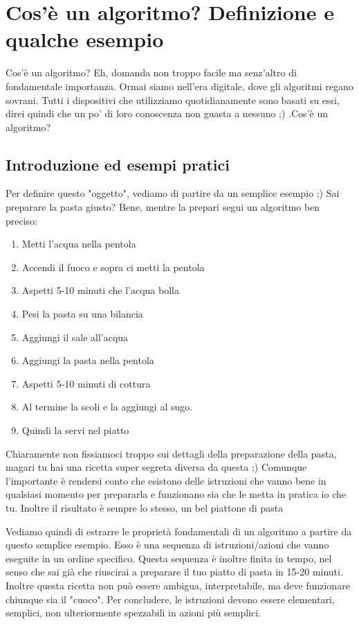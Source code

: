 
\chapter{Cos'è un algoritmo? Definizione e qualche esempio}
Cos'è un algoritmo? Eh, domanda non troppo facile ma senz'altro di fondamentale importanza. Ormai siamo nell'era digitale, dove gli algoritmi regano sovrani. Tutti i dispositivi che utilizziamo quotidianamente sono basati su essi, direi quindi che un po' di loro conoscenza non guasta a nessuno ;) .Cos'è un algoritmo?

\section{Introduzione ed esempi pratici}

Per definire questo "oggetto", vediamo di partire da un semplice esempio ;) Sai preparare la pasta giusto? Bene, mentre la prepari segui un algoritmo ben preciso:

\begin{enumerate}
	\item Metti l'acqua nella pentola
	\item Accendi il fuoco e sopra ci metti la pentola
	\item Aspetti 5-10 minuti che l'acqua bolla
	\item Pesi la pasta su una bilancia
	\item Aggiungi il sale all'acqua
	\item Aggiungi la pasta nella pentola
	\item Aspetti 5-10 minuti di cottura
	\item Al termine la scoli e la aggiungi al sugo.
	\item Quindi la servi nel piatto
\end{enumerate}

Chiaramente non fissiamoci troppo sui dettagli della preparazione della pasta, magari tu hai una ricetta super segreta diversa da questa ;) Comunque l'importante è rendersi conto che esistono delle istruzioni che vanno bene in qualsiasi momento per prepararla e funzionano sia che le metta in pratica io che tu. Inoltre il risultato è sempre lo stesso, un bel piattone di pasta 

Vediamo quindi di estrarre le proprietà fondamentali di un algoritmo a partire da questo semplice esempio. Esso è una sequenza di istruzioni/azioni che vanno eseguite in un ordine specifico. Questa sequenza è inoltre finita in tempo, nel senso che sai già che riuscirai a preparare il tuo piatto di pasta in 15-20 minuti. Inoltre questa ricetta non può essere ambigua, interpretabile, ma deve funzionare chiunque sia il "cuoco". Per concludere, le istruzioni devono essere elementari, semplici, non ulteriormente spezzabili in azioni più semplici.

